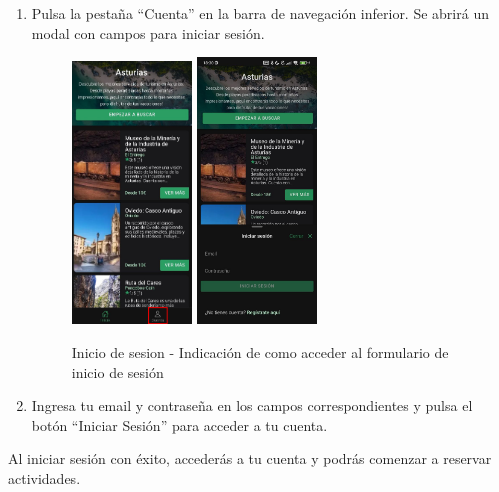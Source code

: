 \begin{enumerate}
	\item Pulsa la pestaña “Cuenta” en la barra de navegación inferior. Se abrirá un modal con campos para iniciar sesión.
	      \begin{figure}[H]
		      \centering
		      \includegraphics[width=0.3\textwidth]{7-Construccion/Manuales/app/P1-Registro.png}
		      \includegraphics[width=0.3\textwidth]{7-Construccion/Manuales/app/inicio de sesion.png}
		      \caption{Inicio de sesion - Indicación de como acceder al formulario de inicio de sesión}
	      \end{figure}
	\item Ingresa tu email y contraseña en los campos correspondientes y pulsa el botón “Iniciar Sesión” para acceder a tu cuenta.
\end{enumerate}

Al iniciar sesión con éxito, accederás a tu cuenta y podrás comenzar a reservar actividades.

